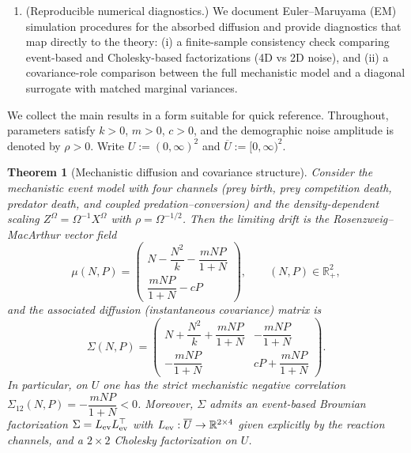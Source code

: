 \documentclass[pdflatex,sn-mathphys-ay]{sn-jnl}
\theoremstyle{thmstyleone}
\newtheorem{theorem}{Theorem}[section]
\theoremstyle{definition}
\theoremstyle{remark}
\begin{document}
\begin{enumerate}[label=(C\arabic*)]
\item (Reproducible numerical diagnostics.)
We document Euler--Maruyama (EM) simulation procedures for the absorbed diffusion and provide diagnostics that map
directly to the theory: (i) a finite-sample consistency check comparing event-based and Cholesky-based
factorizations (4D vs 2D noise), and (ii) a covariance-role comparison between the full mechanistic model and a
diagonal surrogate with matched marginal variances.
\end{enumerate}


We collect the main results in a form suitable for quick reference.
Throughout, parameters satisfy $k>0$, $m>0$, $c>0$, and the demographic noise amplitude is denoted by $\rho>0$.
Write $U:=(0,\infty)^2$ and $\overline U:=[0,\infty)^2$.

\medskip

\begin{theorem}[Mechanistic diffusion and covariance structure]\label{thm:intro_mech_diffusion}
Consider the mechanistic event model with four channels
(prey birth, prey competition death, predator death, and coupled predation--conversion) and the
density-dependent scaling $Z^\Omega=\Omega^{-1}X^\Omega$ with $\rho=\Omega^{-1/2}$.
Then the limiting drift is the Rosenzweig--MacArthur vector field
\begin{equation}\label{eq:intro_mu}
\mu(N,P)=
\begin{pmatrix}
   N-\dfrac{N^2}{k}-\dfrac{mNP}{1+N} \\[8pt]
   \dfrac{mNP}{1+N}-cP
\end{pmatrix},
\qquad (N,P)\in\mathbb{R}_+^2,
\end{equation}
and the associated diffusion (instantaneous covariance) matrix is
\begin{equation}\label{eq:intro_Sigma}
\Sigma(N,P)=
\begin{pmatrix}
N+\dfrac{N^2}{k}+\dfrac{mNP}{1+N} & -\dfrac{mNP}{1+N}\\[8pt]
-\dfrac{mNP}{1+N} & cP+\dfrac{mNP}{1+N}
\end{pmatrix}.
\end{equation}
In particular, on $U$ one has the strict mechanistic negative correlation
$\Sigma_{12}(N,P)=-\dfrac{mNP}{1+N}<0$.
Moreover, $\Sigma$ admits an event-based Brownian factorization $\Sigma=L_{\rm ev}L_{\rm ev}^{\top}$
with $L_{\rm ev}:\overline U\to\mathbb{R}^{2\times 4}$ given explicitly by the reaction channels, and a
$2\times2$ Cholesky factorization on $U$.
\end{theorem}
\end{document}
